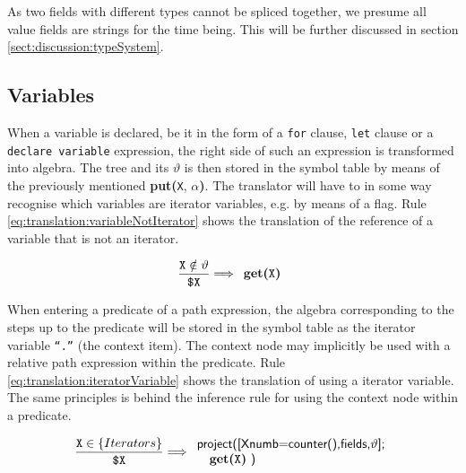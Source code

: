 As two fields with different types cannot be spliced together, we presume all
\textsf{value} fields are strings for the time being. This will be further
discussed in section \ref{sect:discussion:typeSystem}.

\subsection{Variables}

\label{sect:translation:mXr:variables}
When a variable is declared, be it in the form of a \texttt{for} clause, \texttt{let} clause or a \texttt{declare
variable} expression, the right side of such an expression is transformed into algebra. The tree and its
$\vartheta$ is then stored in the symbol table by means of the previously mentioned \textbf{put(}\texttt{X},
$\alpha$\textbf{)}. The translator will have to in some way recognise which variables are iterator variables, e.g.
by means of a flag. Rule \ref{eq:translation:variableNotIterator} shows the translation of the reference of a
variable that is not an iterator.

\begin{equation}
\centering
\frac{\displaystyle \texttt{X} \notin \vartheta}{\displaystyle \texttt{\$X}}
\Longrightarrow
\begin{array}{l}
	\mbox{\textbf{get(}\texttt{X}\textbf{)}}
\end{array}
\label{eq:translation:variableNotIterator}
\end{equation}

When entering a predicate of a path expression, the algebra corresponding to the steps up to the predicate will be
stored in the symbol table as the iterator variable \texttt{``.''} (the context item). The context node may
implicitly be used with a relative path expression within the predicate. Rule
\ref{eq:translation:iteratorVariable} shows the translation of using a iterator variable. The same principles is
behind the inference rule for using the context node within a predicate.

\begin{equation}
\centering
\frac{\displaystyle \texttt{X} \in \left\{ Iterators \right\}}
	{\displaystyle \texttt{\$X}}
\Longrightarrow
\begin{array}{l}
	\mbox{\textsf{project([Xnumb=counter(),fields,}} \vartheta
	\mbox{\textsf{];}}
	\\ \quad
	\mbox{\textbf{get(}\texttt{X}\textbf{)} \textsf{)}}
\end{array}
\label{eq:translation:iteratorVariable}
\end{equation}

